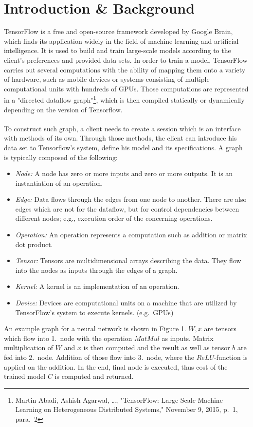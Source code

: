 \documentclass[ieeetran]{article}
\begin{document}
\section{Introduction \& Background} %
\label{sec:introduction}
TensorFlow is a free and open-source framework developed by Google Brain, which finds its application widely in the field of machine learning and artificial intelligence. It is used to build and train large-scale models according to the client's preferences and provided data sets. In order to train a model, TensorFlow carries out several computations with the ability of mapping them onto a variety of hardware, such as mobile devices or systems consisting of multiple computational units with hundreds of GPUs. Those computations are represented in a "directed dataflow graph"\footnote{Martin Abadi, Ashish Agarwal, \ldots, "TensorFlow: Large-Scale Machine Learning on Heterogeneous Distributed Systems," November 9, 2015, p.\ 1, para.\ 2}, which is then compiled statically or dynamically depending on the version of Tensorflow. 
\\ \\To construct such graph, a client needs to create a session which is an interface with methods of its own. Through those methods, the client can introduce his data set to Tensorflow's system, define his model and its specifications. A graph is typically composed of the following:
\begin{itemize}
  \item \textit{Node:} A node has zero or more inputs and zero or more outputs. It is an instantiation of an operation.
\item \textit{Edge:} Data flows through the edges from one node to another. There are also edges which are not for the dataflow, but for control dependencies between different nodes; e.g., execution order of the concerning operations.
\item \textit{Operation:} An operation represents a computation such as addition or matrix dot product.
\item \textit{Tensor:} Tensors are multidimensional arrays describing the data. They flow into the nodes as inputs through the edges of a graph.
\item \textit{Kernel:} A kernel is an implementation of an operation.
\item \textit{Device:} Devices are computational units on a machine that are utilized by TensorFlow's system to execute kernels. (e.g.\ GPUs)
\end{itemize}
An example graph for a neural network is shown in Figure 1. $W, x$ are tensors which flow into 1.\ node with the operation $MatMul$ as inputs. Matrix multiplication of $W$ and $x$ is then computed and the result as well as tensor $b$ are fed into 2.\ node. Addition of those flow into 3.\ node, where the $ReLU$-function is applied on the addition. In the end, final node is executed, thus cost of the trained model $C$ is computed and returned.
\end{document}
